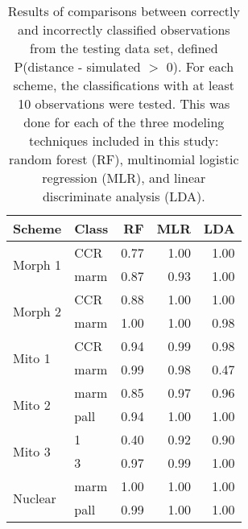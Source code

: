 \documentclass{article}
\begin{document}
\begin{table}
  \centering
  \caption{Results of comparisons between correctly and incorrectly classified observations from the testing data set, defined P(distance - simulated \(>\) 0). For each scheme, the classifications with at least 10 observations were tested. This was done for each of the three modeling techniques included in this study: random forest (RF), multinomial logistic regression (MLR), and linear discriminate analysis (LDA).}
  \begin{tabular}{ l | l r r r }
    \hline
    Scheme & Class & RF & MLR & LDA \\
    \hline
    \hline
    \multirow{2}{*}{Morph 1} & CCR & 0.77 & 1.00 & 1.00 \\ 
    & marm & 0.87 & 0.93 & 1.00 \\ 
    \hline
    \multirow{2}{*}{Morph 2} & CCR & 0.88 & 1.00 & 1.00 \\ 
    & marm & 1.00 & 1.00 & 0.98 \\ 
    \hline
    \multirow{2}{*}{Mito 1} & CCR & 0.94 & 0.99 & 0.98 \\ 
    & marm & 0.99 & 0.98 & 0.47 \\ 
    \hline
    \multirow{2}{*}{Mito 2} & marm & 0.85 & 0.97 & 0.96 \\ 
    & pall & 0.94 & 1.00 & 1.00 \\ 
    \hline
    \multirow{2}{*}{Mito 3} & 1 & 0.40 & 0.92 & 0.90 \\ 
    & 3 & 0.97 & 0.99 & 1.00 \\ 
    \hline
    \multirow{2}{*}{Nuclear} & marm & 1.00 & 1.00 & 1.00 \\ 
    & pall & 0.99 & 1.00 & 1.00 \\ 
    \hline
  \end{tabular}
  \label{tab:miss_tests}
\end{table}
\end{document}

